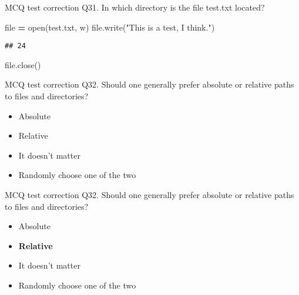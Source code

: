 \documentclass[
  8pt,
  ignorenonframetext,
]{beamer}
\newenvironment{Shaded}{\begin{snugshade}}{\end{snugshade}}
\newcommand{\BuiltInTok}[1]{#1}
\newcommand{\NormalTok}[1]{#1}
\newcommand{\OperatorTok}[1]{\textcolor[rgb]{0.81,0.36,0.00}{\textbf{#1}}}
\newcommand{\StringTok}[1]{\textcolor[rgb]{0.31,0.60,0.02}{#1}}
\providecommand{\tightlist}{%
  \setlength{\itemsep}{0pt}\setlength{\parskip}{0pt}}
\begin{document}
\begin{frame}[fragile]{MCQ test correction}
\protect\hypertarget{mcq-test-correction-61}{}
Q31. In which directory is the file test.txt located?

\begin{Shaded}
\begin{Highlighting}[]
\BuiltInTok{file} \OperatorTok{=} \BuiltInTok{open}\NormalTok{(}\StringTok{\textquotesingle{}test.txt\textquotesingle{}}\NormalTok{, }\StringTok{\textquotesingle{}w\textquotesingle{}}\NormalTok{)}
\BuiltInTok{file}\NormalTok{.write(}\StringTok{"This is a test, I think."}\NormalTok{)}
\end{Highlighting}
\end{Shaded}

\begin{verbatim}
## 24
\end{verbatim}

\begin{Shaded}
\begin{Highlighting}[]
\BuiltInTok{file}\NormalTok{.close()}
\end{Highlighting}
\end{Shaded}
\end{frame}

\begin{frame}{MCQ test correction}
\protect\hypertarget{mcq-test-correction-62}{}
Q32. Should one generally prefer absolute or relative paths to files and
directories?

\begin{itemize}
\tightlist
\item
  Absolute
\item
  Relative
\item
  It doesn't matter
\item
  Randomly choose one of the two
\end{itemize}
\end{frame}

\begin{frame}{MCQ test correction}
\protect\hypertarget{mcq-test-correction-63}{}
Q32. Should one generally prefer absolute or relative paths to files and
directories?

\begin{itemize}
\tightlist
\item
  Absolute
\item
  \textbf{Relative}
\item
  It doesn't matter
\item
  Randomly choose one of the two
\end{itemize}
\end{frame}
\end{document}
